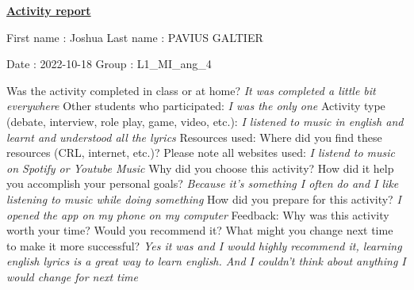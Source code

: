 \documentclass[]{article}
\begin{document}
  \begin{center}
    \underline{\textbf{Activity report}}
  \end{center}
  \vspace*{20 pt}

First name : Joshua
  \hspace*{120pt}
Last name : PAVIUS GALTIER
  \newline

Date : 2022-10-18
  \hspace*{170pt}
Group : L1\_MI\_ang\_4
  \newline

  Was the activity completed in class or at home? \newline
\indent\emph{It was completed a little bit everywhere}
  \newline
  \indent Other students who participated: \newline
\indent\emph{I was the only one}
  \newline\newline\newline\newline
  Activity type (debate, interview, role play, game, video, etc.):
\indent\emph{I listened to music in english and learnt and understood all the lyrics}
  \newline\newline\newline\newline
  Resources used: Where did you find these resources (CRL, internet, etc.)? Please note all websites used: 
\indent\emph{I listend to music on Spotify or Youtube Music}
  \newline\newline\newline\newline
  Why did you choose this activity? How did it help you accomplish your personal goals?
\indent\emph{Because it's something I often do and I like listening to music while doing something}
  \newline\newline\newline\newline
  How did you prepare for this activity? 
\indent\emph{I opened the app on my phone on my computer}
  \newline\newline\newline\newline
  Feedback: Why was this activity worth your time? Would you recommend it? What might you change next time to make it more successful? 
  \newline\newline
\indent\emph{Yes it was and I would highly recommend it, learning english lyrics is a great way to learn english. And I couldn't think about anything I would change for next time}
\end{document}
